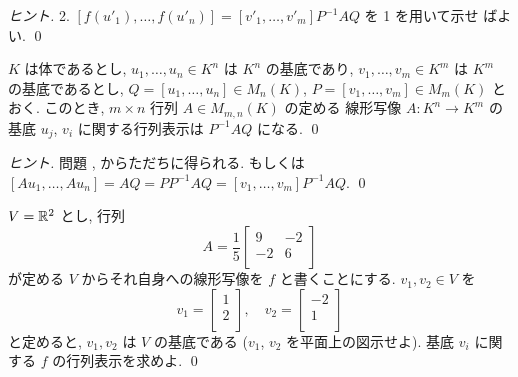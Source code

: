 \documentclass[12pt,twoside]{jarticle}
\begin{document}
\begin{proof}[ヒント]
  2. $[f(u'_1),\ldots,f(u'_n)]=[v'_1,\ldots,v'_m]P^{-1}AQ$ を 1 を用いて示せ
  ばよい. \qed
\end{proof}


\begin{question}[5点]
  $K$ は体であるとし, 
  $u_1,\ldots,u_n\in K^n$ は $K^n$ の基底であり, 
  $v_1,\ldots,v_m\in K^m$ は $K^m$ の基底であるとし,
  $Q=[u_1,\ldots,u_n]\in M_n(K)$, $P=[v_1,\ldots,v_m]\in M_m(K)$ とおく.
  このとき, $m\times n$ 行列 $A\in M_{m,n}(K)$ の定める
  線形写像 $A:K^n\to K^m$ の
  基底 $u_j$, $v_i$ に関する行列表示は $P^{-1}AQ$ になる.
  \qed
\end{question}

\begin{proof}[ヒント]
  問題 ,  からただちに得られる.
  もしくは $[Au_1,\ldots,Au_n]=AQ=PP^{-1}AQ=[v_1,\ldots,v_m]P^{-1}AQ$. 
  \qed
\end{proof}


\begin{question}[5点]
  \label{q:9,-2,-2,6}
  $V={\mathbb R}^2$ とし, 行列
  \begin{equation*}
    A = \frac{1}{5}
    \begin{bmatrix}
      9 & -2 \\
      -2 & 6 \\
    \end{bmatrix}
  \end{equation*}
  が定める $V$ からそれ自身への線形写像を $f$ と書くことにする.
  $v_1,v_2\in V$ を
  \begin{equation*}
    v_1 = %
    \begin{bmatrix} 1 \\ 2 \\ \end{bmatrix},
    \quad
    v_2 = %
    \begin{bmatrix} -2 \\ 1 \\ \end{bmatrix}
  \end{equation*}
  と定めると, $v_1,v_2$ は $V$ の基底である
  ($v_1$, $v_2$ を平面上の図示せよ).
  基底 $v_i$ に関する $f$ の行列表示を求めよ.
  \qed
\end{question}
\end{document}
